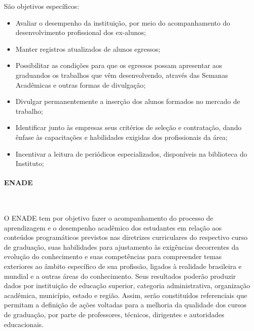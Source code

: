 São objetivos específicos:

\begin{itemize}
\item Avaliar o desempenho da instituição, por meio do acompanhamento do desenvolvimento profissional dos ex-alunos;

\item Manter registros atualizados de alunos egressos;

\item Possibilitar as condições para que os egressos possam apresentar aos graduandos os trabalhos que vêm desenvolvendo, através das Semanas Acadêmicas e outras formas de divulgação;

\item Divulgar permanentemente a inserção dos alunos formados no mercado de trabalho;

\item Identificar junto às empresas seus critérios de seleção e contratação, dando ênfase às capacitações e habilidades exigidas dos profissionais da área;

\item Incentivar a leitura de periódicos especializados, disponíveis na biblioteca do Instituto;
\end{itemize}

\paragraph{ENADE}\

  O ENADE tem por objetivo fazer o acompanhamento do processo de aprendizagem e o desempenho acadêmico dos estudantes em relação aos conteúdos programáticos previstos nas diretrizes curriculares do respectivo curso de graduação, suas habilidades para ajustamento às exigências decorrentes da evolução do conhecimento e suas competências para compreender temas exteriores ao âmbito específico de sua profissão, ligados à realidade brasileira e mundial e a outras áreas do conhecimento. Seus resultados poderão produzir dados por instituição de educação superior, categoria administrativa, organização acadêmica, município, estado e região. Assim, serão constituídos referenciais que permitam a definição de ações voltadas para a melhoria da qualidade dos cursos de graduação, por parte de professores, técnicos, dirigentes e autoridades educacionais. 



